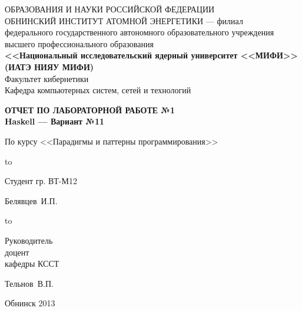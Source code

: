 
\begin{titlepage}
\newpage

\begin{center}
{\small{} ОБРАЗОВАНИЯ И НАУКИ РОССИЙСКОЙ ФЕДЕРАЦИИ\\
ОБНИНСКИЙ ИНСТИТУТ АТОМНОЙ ЭНЕРГЕТИКИ --- филиал}\\
федерального государственного автономного образовательного учреждения\\
высшего профессионального образования\\
{\bf<<Национальный исследовательский ядерный университет <<МИФИ>>\\
(ИАТЭ НИЯУ МИФИ)}\\
\vspace{2em}
Факультет кибернетики\\
Кафедра компьютерных систем, сетей и технологий
\end{center}
\vspace{2em}


\vspace{5em}
\begin{center}
\textbf{ОТЧЕТ ПО ЛАБОРАТОРНОЙ РАБОТЕ №1\\ Haskell --- Вариант №11}
\end{center}


\begin{center}
По курсу <<Парадигмы и паттерны программирования>>
\end{center}

\vspace{6em}

\hbox to \textwidth
{\parbox{6 cm}{Студент гр. ВТ-М12}\dotfill \parbox{4 cm}{
\begin{flushright}Белявцев~И.П.\end{flushright}}}
\vspace{2em}

\hbox to \textwidth
{\parbox{6 cm}{Руководитель\\доцент\\ кафедры КССТ}\dotfill \parbox{4 cm}{
\begin{flushright}Тельнов~В.П.\end{flushright}}}
\vspace{2em}



\vspace{\fill}

\begin{center}
Обнинск 2013
\end{center}

\end{titlepage}